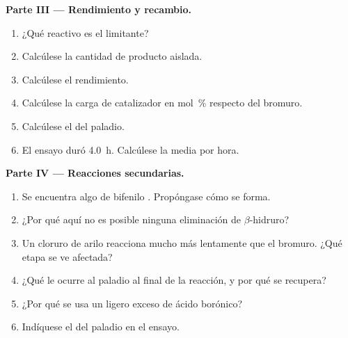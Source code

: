 \begin{problem}
\medskip
\noindent\textbf{Parte III --- Rendimiento y recambio.}
\begin{enumerate}[resume]
  \item ¿Qué reactivo es el limitante?
  \item Calcúlese la cantidad de producto aislada.
  \item Calcúlese el rendimiento.
  \item Calcúlese la carga de catalizador en mol~\% respecto del bromuro.
  \item Calcúlese el  del paladio.
  \item El ensayo duró \qty{4.0}{h}. Calcúlese la  media por hora.
\end{enumerate}

\medskip
\noindent\textbf{Parte IV --- Reacciones secundarias.}
\begin{enumerate}[resume]
  \item Se encuentra algo de bifenilo . Propóngase cómo se forma.
  \item ¿Por qué aquí no es posible ninguna eliminación de $\beta$-hidruro?
  \item Un cloruro de arilo reacciona mucho más lentamente que el bromuro. ¿Qué etapa se ve afectada?
  \item ¿Qué le ocurre al paladio al final de la reacción, y por qué se recupera?
  \item ¿Por qué se usa un ligero exceso de ácido borónico?
  \item Indíquese el  del paladio en el ensayo.
\end{enumerate}
\end{problem}
